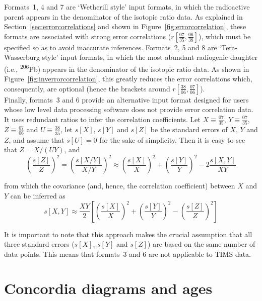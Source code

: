 \begin{refsection}
Formats~1, 4 and 7 are `Wetherill style' input formats, in which the
radioactive parent appears in the denominator of the isotopic ratio
data. As explained in Section~\ref{sec:errorcorrelations} and shown in
Figure~\ref{fig:errorcorrelation}, these formats are associated with
strong error correlations
($r\left[\frac{07}{35},\frac{06}{38}\right]$), which must be specified
so as to avoid inaccurate inferences.  Formats~2, 5 and 8 are
`Tera-Wasserburg style' input formats, in which the most abundant
radiogenic daughter (i.e., \textsuperscript{206}Pb) appears in the
denominator of the isotopic ratio data.  As shown in
Figure~\ref{fig:inverrorcorrelation}, this greatly reduces the error
correlations which, consequently, are optional (hence the brackets
around $r\left[\frac{38}{06},\frac{07}{06}\right]$).\\

Finally, formats~3 and 6 provide an alternative input format designed
for users whose low level data processing software does not provide
error correlation data. It uses redundant ratios to infer the
correlation coefficients. Let $X \equiv \frac{07}{35}$, $Y \equiv
\frac{07}{35}$, $Z \equiv \frac{07}{06}$ and $U \equiv \frac{38}{35}$,
let $s[X]$, $s[Y]$ and $s[Z]$ be the standard errors of $X$, $Y$ and
$Z$, and assume that $s[U]=0$ for the sake of simplicity. Then it is
easy to see that $Z = X/(U Y)$, and
\begin{equation}
  \left(\frac{s[Z]}{Z}\right)^2 = \left(\frac{s[X/Y]}{X/Y}\right)^2
  \approx \left(\frac{s[X]}{X}\right)^2 + \left(\frac{s[Y]}{Y}\right)^2 -
  2 \frac{s[X,Y]}{XY}
\end{equation}

\noindent from which the covariance (and, hence, the correlation
coefficient) between $X$ and $Y$ can be inferred as
\begin{equation}
  s[X,Y] \approx \frac{XY}{2}
  \left[
    \left(\frac{s[X]}{X}\right)^2 +
    \left(\frac{s[Y]}{Y}\right)^2 -
    \left(\frac{s[Z]}{Z}\right)^2
    \right]
\end{equation}

It is important to note that this approach makes the crucial
assumption that all three standard errors ($s[X]$, $s[Y]$ and $s[Z]$)
are based on the same number of data points. This means that formats~3
and 6 are not applicable to TIMS data.

\section{Concordia diagrams and ages}
\label{sec:concordia}


\end{refsection}
